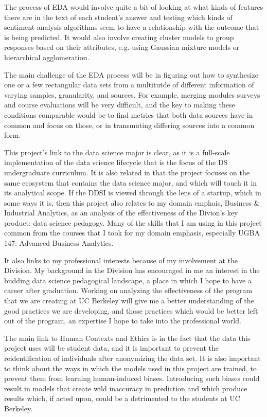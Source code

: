 \documentclass[11pt, oneside]{article}   	%
\begin{document}
The process of EDA would involve quite a bit of looking at what kinds of features there are in the text of each student's answer and testing which kinds of sentiment analysis algorithms seem to have a relationship with the outcome that is being predicted. It would also involve creating cluster models to group responses based on their attributes, e.g. using Gaussian mixture models or hierarchical agglomeration.

The main challenge of the EDA process will be in figuring out how to synthesize one or a few rectangular data sets from a multitutde of different information of varying samples, granularity, and sources. For example, merging modules surveys and course evaluations will be very difficult, and the key to making these conditions comparable would be to find metrics that both data sources have in common and focus on those, or in transmuting differing sources into a common form.

This project's link to the data science major is clear, as it is a full-scale implementation of the data science lifecycle that is the focus of the DS undergraduate curriculum. It is also related in that the project focuses on the same ecosystem that contains the data science major, and which will touch it in its analytical scope. If the DDSI is viewed through the lens of a startup, which in some ways it is, then this project also relates to my domain emphais, Business \& Industrial Analytics, as an analysis of the effectiveness of the Divion's key product: data science pedagogy. Many of the skills that I am using in this project common from the courses that I took for my domain emphasis, especially UGBA 147: Advanced Business Analytics.

It also links to my professional interests because of my involvement at the Division. My background in the Division has encouraged in me an interest in the budding data science pedagogical landscape, a place in which I hope to have a career after graduation. Working on analyzing the effectiveness of the program that we are creating at UC Berkeley will give me a better understanding of the good practices we are developing, and those practices which would be better left out of the program, an expertise I hope to take into the professional world.

The main link to Human Contexts and Ethics is in the fact that the data this project uses will be student data, and it is important to prevent the reidentification of individuals after anonymizing the data set. It is also important to think about the ways in which the models used in this project are trained, to prevent them from learning human-induced biases. Introducing such biases could result in models that create wild inaccuracy in prediction and which produce results which, if acted upon, could be a detrimented to the students at UC Berkeley.
\end{document}

